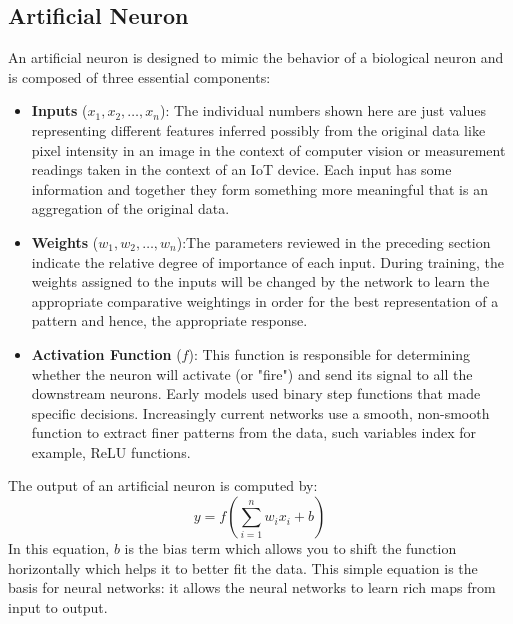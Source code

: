     \subsection{Artificial Neuron}  An artificial neuron is designed to mimic the behavior of a biological neuron and is composed of three essential components:
    \begin{itemize} 
        \item \textbf{Inputs} ($x_1, x_2, \ldots, x_n$): The individual numbers shown here are just values representing different features inferred possibly from the original data like pixel intensity in an image in the context of computer vision or measurement readings taken in the context of an IoT device. Each input has some information and together they form something more meaningful that is an aggregation of the original data. 
        \item \textbf{Weights} ($w_1, w_2, \ldots, w_n$):The parameters reviewed in the preceding section indicate the relative degree of importance of each input. During training, the weights assigned to the inputs will be changed by the network to learn the appropriate comparative weightings in order for the best representation of a pattern and hence, the appropriate response.
        \item \textbf{Activation Function} ($f$): This function is responsible for determining whether the neuron will activate (or "fire") and send its signal to all the downstream neurons. Early models used binary step functions that made specific decisions. Increasingly current networks use a smooth, non-smooth function to extract finer patterns from the data, such variables index for example, ReLU \cite{nair2010rectified} functions.
    \end{itemize}
    The output of an artificial neuron is computed by: 
    \begin{equation}  y = f\left(\sum_{i=1}^n w_i x_i + b\right) \end{equation} 
    In this equation, $b$ is the bias term which allows you to shift the function horizontally which helps it to better fit the data. This simple equation is the basis for neural networks: it allows the neural networks to learn rich maps from input to output.


